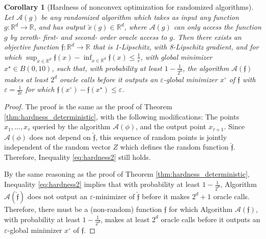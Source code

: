 \documentclass[11pt,letterpaper]{article}
\renewcommand{\epsilon}{\varepsilon}
\newtheorem{corollary}[theorem]{Corollary}
\begin{document}
\begin{corollary}[Hardness of nonconvex optimization for randomized algorithms] \label{thm:hardness_randomized}
%
Let $\mathcal{A}(g)$ be any randomized algorithm which takes as input any function $g: \mathbb{R}^d \rightarrow \mathbb{R}$,  and has output $\tilde{x}(g) \in \mathbb{R}^d$, where $\mathcal{A}(g)$ can only access the function $g$ by zeroth- first- and second- order oracle access to $g$. 
%
 Then there exists an objective function $\mathfrak{f}: \mathbb{R}^d \rightarrow \mathbb{R}$ that is 1-Lipschitz, with 8-Lipschitz gradient, and for which $\sup_{x\in \mathbb{R}^d} \mathfrak{f}(x) - \inf_{x\in \mathbb{R}^d} \mathfrak{f}(x) \leq \frac{1}{e}$, with global minimizer $x^\star \in B(0,10)$, such that, with probability at least $1-\frac{1}{2^d}$, the algorithm $\mathcal{A}(\mathfrak{f})$ makes at least $2^d$ oracle calls before it outputs an $\epsilon$-global minimizer $x^\circ$ of $\mathfrak{f}$ with $\epsilon = \frac{1}{2e}$ for which $\mathfrak{f}(x^\circ) - \mathfrak{f}(x^\star) \leq \epsilon$.
\end{corollary}
%
\begin{proof}
The proof is the same as the proof of Theorem \ref{thm:hardness_deterministic}, with the following modifications: 
%
The points $x_1,\ldots, x_{\tau}$ queried by the algorithm $\mathcal{A}(\phi)$, and the output point $x_{\tau+1}$. 
%
Since $\mathcal{A}(\phi)$ does not depend on $\hat{\mathfrak{f}}$, this sequence of random points is jointly independent of the random vector $Z$ which defines the random function $\mathfrak{\hat{f}}$. 
%
Therefore, Inequality \eqref{eq:hardness2} still holds.

By the same reasoning  as the proof of Theorem \ref{thm:hardness_deterministic}, Inequality \eqref{eq:hardness2} implies that with probability at least $1-\frac{1}{2^d}$, Algorithm $\mathcal{A}(\hat{\mathfrak{f}})$  does not output an $\epsilon$-minimizer of $\hat{\mathfrak{f}}$ before it makes $2^d +1$ oracle calls. 
%
 Therefore, there must be a (non-random) function $\mathfrak{f}$ for which Algorithm $\mathcal{A}(\mathfrak{f})$,  with probability at least $1-\frac{1}{2^d}$,  makes at least $2^d$ oracle calls before it outputs an $\epsilon$-global minimizer $x^\circ$ of $\mathfrak{f}$.


\end{proof}
\end{document}
